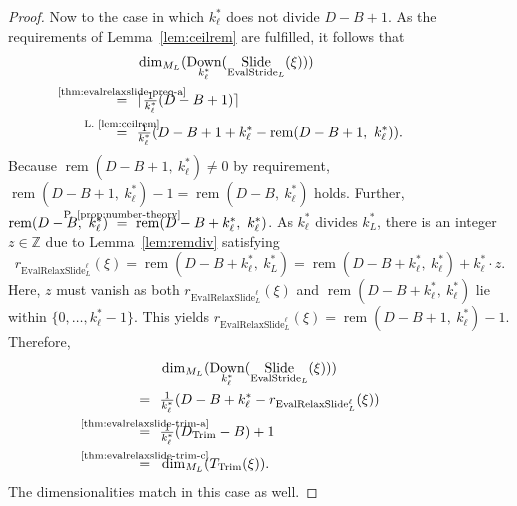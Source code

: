 \documentclass[journal]{IEEEtran}
\newcommand{\Z}{\mathbb{Z}}
\newcommand{\ROI}{B}
\newcommand{\discint}[2]{\{#1,\dotsc,#2\}}
\newcommand{\nceil}[1]{\lceil #1 \rceil}
\DeclareMathOperator{\Slide}{Slide}
\DeclareMathOperator{\EvalStride}{EvalStride}
\DeclareMathOperator{\Trimming}{Trim}
\newcommand{\rem}[2]{\operatorname{rem}(#1,\ #2)}
\newcommand{\equsing}[1]{\overset{\mathclap{\text{#1}}}{=}}
\DeclareMathOperator{\EvalRelaxSlide}{EvalRelaxSlide}
\DeclareMathOperator{\Downsampling}{Down}
\begin{document}
\begin{proof}
Now to the case in which $k_\ell^*$ does not divide $D - \ROI + 1$.
As the requirements of Lemma~\ref{lem:ceilrem} are fulfilled, it follows that
\begin{align*}
  & \dim_{M_L}( \Downsampling_{k_\ell^*}( \Slide_{\EvalStride_L}(\xi) ) )\\
  \equsing{\ref{thm:evalrelaxslide-preq-a}}\ \ & \nceil{\tfrac{1}{k_\ell^*}( D - \ROI + 1 )}\\
  \equsing{L.~\ref{lem:ceilrem}} \ \ & \tfrac{1}{k_\ell^*}(D - \ROI + 1 + k_\ell^* - \rem{D - \ROI + 1}{k_\ell^*})\text{.}
\end{align*}
Because $\rem{D - \ROI + 1}{k_\ell^*} \neq 0$ by requirement, $\rem{D - \ROI + 1}{k_\ell^*} - 1 = \rem{D - \ROI}{k_\ell^*}$ holds.
Further, $\rem{D - \ROI}{k_\ell^*} \ \equsing{P.~\ref{prop:number-theory}} \ \rem{D - \ROI + k_\ell^*}{k_\ell^*}$.
As $k_\ell^*$ divides $k_L^*$, there is an integer $z\in\Z$ due to Lemma~\ref{lem:remdiv} satisfying
\begin{displaymath}
  r_{\EvalRelaxSlide_L^\ell}(\xi) = \rem{D - \ROI + k_\ell^*}{k_L^*} = \rem{D - \ROI + k_\ell^*}{k_\ell^*} + k_\ell^*\cdot z\text{.}
\end{displaymath}
Here, $z$ must vanish as both $r_{\EvalRelaxSlide_L^\ell}(\xi)$ and $\rem{D - \ROI + k_\ell^*}{k_\ell^*}$ lie within $\discint{0}{k_\ell^* - 1}$.
This yields $r_{\EvalRelaxSlide_L^\ell}(\xi) = \rem{D - \ROI + 1}{k_\ell^*} - 1$.
Therefore,
\begin{align*}
  & \dim_{M_L}( \Downsampling_{k_\ell^*}( \Slide_{\EvalStride_L}(\xi) ) )\\
  =\ \ & \tfrac{1}{k_\ell^*}(D - \ROI + k_\ell^* - r_{\EvalRelaxSlide_L^\ell}(\xi))\\
  \equsing{\ref{thm:evalrelaxslide-trim-a}}\ \ & \tfrac{1}{k_\ell^*}(D_{\Trimming} - \ROI) + 1\\
  \equsing{\ref{thm:evalrelaxslide-trim-c}}\ \ & \dim_{M_L}( T_{\Trimming}(\xi) )\text{.}
\end{align*}
The dimensionalities match in this case as well.


\end{proof}
\end{document}

